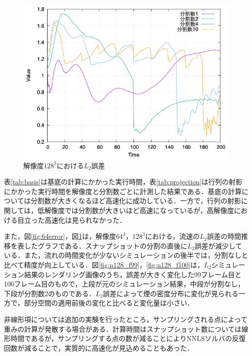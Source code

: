 \documentclass[a4j,12pt]{jreport}
\begin{document}
\begin{figure}[htbp]
\centering
\includegraphics[width=140mm]{images/128error.png}
\caption{$解像度128^3におけるL_2誤差$}
\label{fig:128error}
\end{figure}
表\ref{tab:basis}は基底の計算にかかった実行時間，表\ref{tab:projection}は行列の射影にかかった実行時間を解像度と分割数ごとに計測した結果である．基底の計算については分割数が大きくなるほど高速化に成功している．一方で，行列の射影に関しては，低解像度では分割数が大きいほど高速になっているが，高解像度における目立った高速化は見られなかった．

また，図\ref{fig:64error}，図\ref{fig:128error}は，解像度$64^3$，$128^3$における，流速の$L_2$誤差の時間推移を表したグラフである．スナップショットの分割の直後に$L_2$誤差が減少している．また，流れの時間変化が少ないシミュレーションの後半では，分割なしと比べて精度が向上している．図\ref{fig:n128_f99}，\ref{fig:n128_f100}は，$L_2$シミュレーション結果のレンダリング画像のうち，誤差が大きく変化した99フレーム目と100フレーム目のもので，上段が元のシミュレーション結果，中段が分割なし，下段が分割数2のものである．$L_2$誤差によって煙の密度分布に変化が見られる一方で，部分空間の適用前後の変化と比べると変化量は小さい．

非線形項については追加の実験を行ったところ，サンプリングされる点によって重みの計算が発散する場合がある．計算時間はスナップショット数については線形時間であるが，サンプリングする点の数が減ることによりNNLSソルバの反復回数が減ることで，実質的に高速化が見込めることもあった．

\end{document}
